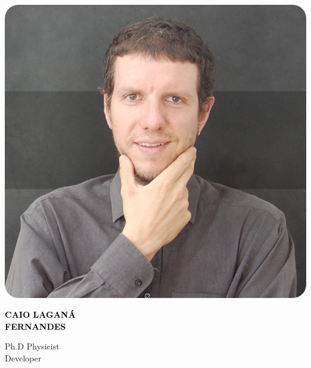 \documentclass[9pt]{developercv} %
\begin{document}

\begin{minipage}[t]{0.2\textwidth} 
	\vspace{-\baselineskip} %

		\includegraphics[width=0.7\linewidth]{caio-round.png}
	
\end{minipage}
\begin{minipage}[t]{0.3\textwidth} 
	\vspace{-\baselineskip} %
	
	{ \fontsize{16}{20} \textcolor{black}{\textbf{\MakeUppercase{Caio Laganá \\[1mm]Fernandes}}}} %
	
	\vspace{6pt}
	
	{\Large Ph.D Physicist\\[1mm]} %
	Developer
\end{minipage}
\hfill
\begin{minipage}[t]{0.2\textwidth} %
	\vspace{-\baselineskip} %
	
	\\ 
  \\
  \\
	
\end{minipage}
\end{document}
